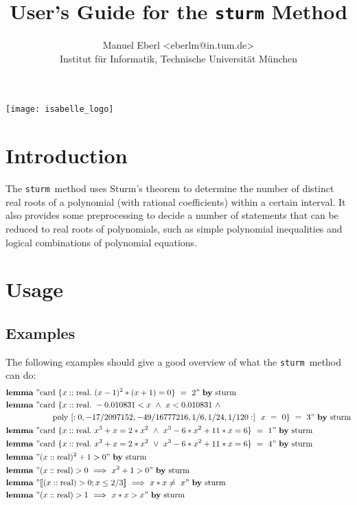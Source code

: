 \documentclass[11pt,a4paper,oneside]{article}
\title{\LARGE User's Guide for the \texttt{sturm} Method\\[4mm]}
\author{\Large Manuel Eberl <eberlm@in.tum.de>\\[1mm]\large Institut für Informatik, Technische Universität München\\[4mm]}
\newcommand{\sturm}{\texttt{sturm}}
\newcommand{\lemma}{\textbf{lemma}}
\newcommand{\card}{\textrm{card}}
\newcommand{\real}{\textrm{real}}
\begin{document}
\begin{center}
\vspace*{20mm}
\texttt{[image: isabelle\_logo]}
\end{center}
\vspace*{-5mm}
{\let\newpage\relax\maketitle}
\vspace*{10mm}
\tableofcontents
\newpage

\section{Introduction}

The \sturm\ method uses Sturm's theorem to determine the number of distinct real roots of a polynomial (with rational coefficients) within a certain interval. It also provides some preprocessing to decide a number of statements that can be reduced to real roots of polynomials, such as simple polynomial inequalities and logical combinations of polynomial equations.
\vspace*{10mm}

\section{Usage}

\subsection{Examples}
The following examples should give a good overview of what the \sturm\ method can do:
\begin{align*}
&\lemma\ "\card\ \{x::\real.\ (x - 1)^2 * (x + 1) = 0\}\  =\  2"\ \textrm{\textbf{by}\ sturm}\\
&\lemma\ "\mathrm{card}\ \{x::\mathrm{real}.\ -0.010831 < x\ \wedge\ x < 0.010831\ \wedge\\
&\hskip20mm \mathrm{poly}\ [:0, -17/2097152, -49/16777216, 1/6, 1/24, 1/120:]\ \ x\ =\ 0\}\  =\  3"\ \textrm{\textbf{by}\ sturm}\\
&\lemma\ "\card\ \{x::\real.\ x^3 + x = 2*x^2\ \wedge\ x^3-6*x^2+11*x=6\}\  =\  1"\ \textrm{\textbf{by}\ sturm}\\
&\lemma\ "\card\ \{x::\real.\ x^3 + x = 2*x^2\ \vee\ x^3-6*x^2+11*x=6\}\  =\  4"\ \textrm{\textbf{by}\ sturm}\\
&\lemma\ "(x::\real)^2+1 > 0"\ \textrm{\textbf{by}\ sturm}\\
&\lemma\ "(x::\real) > 0\ \Longrightarrow\ x^2+1 > 0"\ \textrm{\textbf{by}\ sturm}\\
&\lemma\ "\llbracket (x::\real) > 0; x \leq 2/3\rrbracket\ \Longrightarrow\ x*x \neq\ x"\ \textrm{\textbf{by}\ sturm}\\
&\lemma\ "(x::\real) > 1\ \Longrightarrow\ x*x > x"\ \textrm{\textbf{by}\ sturm}\\
\end{align*}
\end{document}
